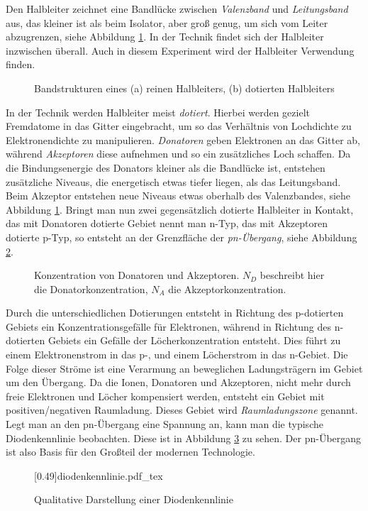 Den Halbleiter zeichnet eine Bandlücke zwischen \emph{Valenzband} und 
\emph{Leitungsband} aus, das kleiner ist als beim Isolator, aber groß genug,
um sich vom Leiter abzugrenzen, siehe Abbildung \ref{abb:band}.
In der Technik findet sich der Halbleiter inzwischen überall.
Auch in diesem Experiment wird der Halbleiter Verwendung finden. \par
\begin{figure}[h]
  \begin{subfigure}{0.3\textwidth}
    
  \end{subfigure}
  \begin{subfigure}{0.7\textwidth}
    
  \end{subfigure}
  \caption{Bandstrukturen eines (a) reinen Halbleiters, (b) dotierten Halbleiters}
  \label{abb:band}
\end{figure}
In der Technik werden Halbleiter meist \emph{dotiert}. Hierbei werden gezielt 
Fremdatome in das Gitter eingebracht, um so das Verhältnis von Lochdichte zu
Elektronendichte zu manipulieren. \emph{Donatoren} geben Elektronen an das Gitter 
ab, während \emph{Akzeptoren} diese aufnehmen und so ein zusätzliches Loch 
schaffen. Da die Bindungsenergie des Donators kleiner als die Bandlücke ist, entstehen
zusätzliche Niveaus, die energetisch etwas tiefer liegen, als das Leitungsband.
Beim Akzeptor entstehen neue Niveaus etwas oberhalb des Valenzbandes, siehe 
Abbildung \ref{abb:band}.
Bringt man nun zwei gegensätzlich dotierte Halbleiter in Kontakt, das mit Donatoren
dotierte Gebiet nennt man n-Typ, das mit Akzeptoren dotierte p-Typ, so entsteht an
der Grenzfläche der \emph{pn-Übergang}, siehe Abbildung \ref{abb:pn}.
\begin{figure}[h]
  \centering
  
  \caption{Konzentration von Donatoren und Akzeptoren. $N_D$ beschreibt hier die
           Donatorkonzentration, $N_A$ die Akzeptorkonzentration.}
  \label{abb:pn}
\end{figure}
Durch die unterschiedlichen Dotierungen entsteht in Richtung des p-dotierten Gebiets
ein Konzentrationsgefälle für Elektronen, während in Richtung des n-dotierten 
Gebiets ein Gefälle der Löcherkonzentration entsteht. Dies führt zu einem
Elektronenstrom in das p-, und einem Löcherstrom in das n-Gebiet. Die Folge dieser
Ströme ist eine Verarmung an beweglichen Ladungsträgern im Gebiet um den 
Übergang. Da die Ionen, Donatoren und Akzeptoren, nicht mehr durch freie Elektronen
und Löcher kompensiert werden, entsteht ein Gebiet mit positiven/negativen
Raumladung. Dieses Gebiet wird \emph{Raumladungszone} genannt. Legt man an den
pn-Übergang eine Spannung an, kann man die typische Diodenkennlinie beobachten.
Diese ist in Abbildung \ref{abb:diodui} zu sehen.
Der pn-Übergang ist also Basis für den Großteil der modernen Technologie.
\begin{figure}
  \centering
  \scalebox{0.55}[0.49]{{diodenkennlinie.pdf_tex}}
  \caption{Qualitative Darstellung einer Diodenkennlinie \autocite{wiki:diode}}
  \label{abb:diodui}
\end{figure}

